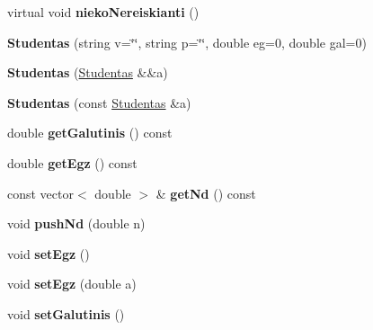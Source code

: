 \begin{DoxyCompactItemize}
\item 
\mbox{\label{class_studentas_ab734f96b52e7626270d02a9e190832b9}} 
virtual void {\bfseries nieko\+Nereiskianti} ()
\item 
\mbox{\label{class_studentas_ad0586e29ae6f2fb3742af60efca04839}} 
{\bfseries Studentas} (string v=\char`\"{}\char`\"{}, string p=\char`\"{}\char`\"{}, double eg=0, double gal=0)
\item 
\mbox{\label{class_studentas_ae374cbb1abbf636821e1ea402a67b563}} 
{\bfseries Studentas} (\mbox{\hyperlink{class_studentas}{Studentas}} \&\&a)
\item 
\mbox{\label{class_studentas_af39024c89a3d703cbd4d079f19bcd9dd}} 
{\bfseries Studentas} (const \mbox{\hyperlink{class_studentas}{Studentas}} \&a)
\item 
\mbox{\label{class_studentas_adff52a10ba657a5c8854693988082820}} 
double {\bfseries get\+Galutinis} () const
\item 
\mbox{\label{class_studentas_adb6ecd72f1921da4c4ae7b8bc6ce81bc}} 
double {\bfseries get\+Egz} () const
\item 
\mbox{\label{class_studentas_a6a0335fc41d0925311e949b1759d5d16}} 
const vector$<$ double $>$ \& {\bfseries get\+Nd} () const
\item 
\mbox{\label{class_studentas_a32cc8ee04851e9e1280009eb48c9d8e3}} 
void {\bfseries push\+Nd} (double n)
\item 
\mbox{\label{class_studentas_a0a03c51d8f261639946535c107f60f17}} 
void {\bfseries set\+Egz} ()
\item 
\mbox{\label{class_studentas_a75fe3d40bc0d9dca12e5e3689d09eb24}} 
void {\bfseries set\+Egz} (double a)
\item 
\mbox{\label{class_studentas_a5619534aa98fe6e17f870a9edd8990f2}} 
void {\bfseries set\+Galutinis} ()
\item 

\end{DoxyCompactItemize}
